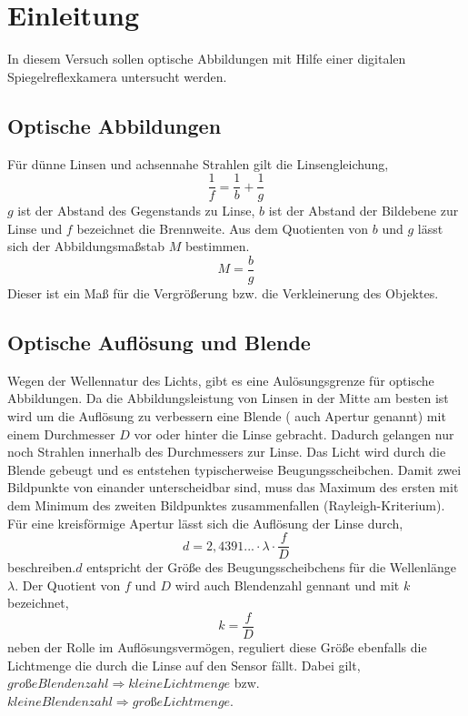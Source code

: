 \section{Einleitung}
In diesem Versuch sollen optische Abbildungen mit Hilfe einer digitalen Spiegelreflexkamera untersucht werden.
\subsection{Optische Abbildungen}
Für dünne Linsen und achsennahe Strahlen gilt die Linsengleichung,
\begin{equation}
\frac{1}{f}=\frac{1}{b}+\frac{1}{g}
\end{equation}
$ \textit{g} $ ist der Abstand des Gegenstands zu Linse, $ \textit{b} $ ist der Abstand der Bildebene zur Linse und $ \textit{f} $ bezeichnet die Brennweite.
Aus dem Quotienten von $ \textit{b} $ und $ \textit{g} $ lässt sich der Abbildungsmaßstab $ \textit{M} $ bestimmen.
\begin{equation}
M=\frac{b}{g}
\end{equation}
Dieser ist ein Maß für die Vergrößerung bzw. die Verkleinerung des Objektes.
\subsection{Optische Auflösung und Blende}
Wegen der Wellennatur des Lichts, gibt es eine Aulösungsgrenze für optische Abbildungen. Da die Abbildungsleistung von Linsen in der Mitte am besten ist wird um die Auflösung zu verbessern eine Blende ( auch Apertur genannt) mit einem Durchmesser $ \textit{D} $ vor oder hinter die Linse gebracht. Dadurch gelangen nur noch Strahlen innerhalb des Durchmessers zur Linse. Das Licht wird durch die Blende gebeugt und es entstehen typischerweise Beugungsscheibchen. Damit zwei Bildpunkte von einander unterscheidbar sind, muss das Maximum des ersten mit dem Minimum des zweiten Bildpunktes zusammenfallen (Rayleigh-Kriterium).
Für eine kreisförmige Apertur lässt sich die Auflösung der Linse durch,
\begin{equation}
d=2,4391...\cdot\lambda\cdot\frac{f}{D}
\end{equation}
beschreiben.$ \textit{d} $ entspricht der Größe des Beugungsscheibchens für die Wellenlänge $ \lambda $.
Der Quotient von $ \textit{f} $ und $ \textit{D} $ wird auch Blendenzahl gennant und mit $ \textit{k} $ bezeichnet,
\begin{equation}
k=\frac{f}{D}
\end{equation}
neben der Rolle im Auflösungsvermögen, reguliert diese Größe ebenfalls die Lichtmenge die durch die Linse auf den Sensor fällt.
Dabei gilt,$ große Blendenzahl \Rightarrow kleine Lichtmenge $ bzw.
$ kleine Blendenzahl \Rightarrow große Lichtmenge $.
